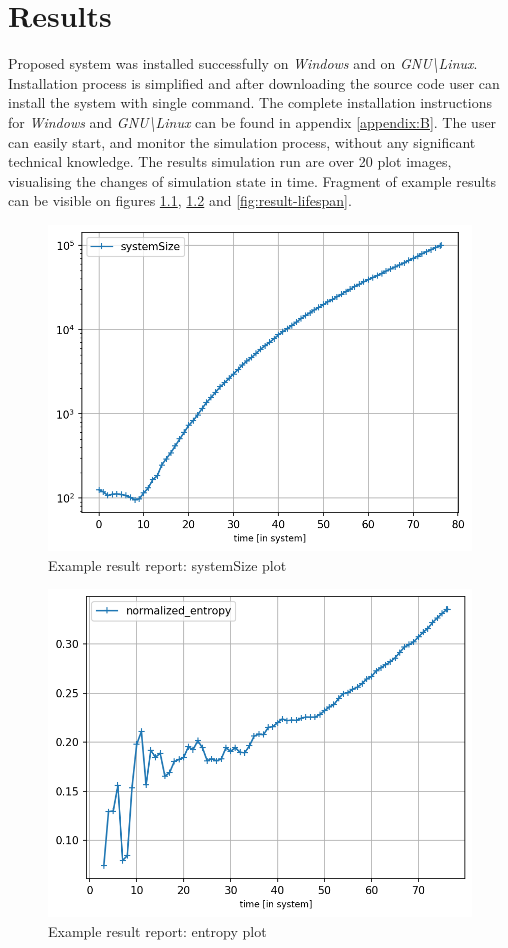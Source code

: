 \chapter{Results}
\label{chapter:5}
Proposed system was installed successfully on \textit{Windows} and on \textit{GNU\textbackslash Linux}. Installation process is simplified and after downloading the source code user can install the system with single command. The complete installation instructions for \textit{Windows} and \textit{GNU\textbackslash Linux} can be found in appendix \ref{appendix:B}. The user can easily start, and monitor the simulation process, without any significant technical knowledge.
The results simulation run are over 20 plot images, visualising the changes of simulation state in time. Fragment of example results can be visible on figures \ref{fig:result-size}, \ref{fig:result-entropy} and \ref{fig:result-lifespan}.
\begin{figure}[h!]
	\centering
		\includegraphics[width=0.7\linewidth]{reports/systemSize.png}
	\caption{Example result report: systemSize plot}
	\label{fig:result-size}
\end{figure}
\begin{figure}[h!]
	\centering
		\includegraphics[width=0.7\linewidth]{reports/entropy.png}
	\caption{Example result report: entropy plot}
	\label{fig:result-entropy}
\end{figure}
